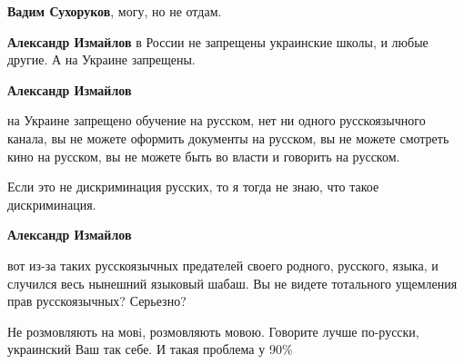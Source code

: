 \begin{itemize}
\begin{itemize}
 
\textbf{Вадим Сухоруков}, могу, но не отдам.

 
\textbf{Александр Измайлов} в России не запрещены украинские школы, и любые другие. А на Украине запрещены.

 
\textbf{Александр Измайлов} 

на Украине запрещено обучение на русском, нет ни одного русскоязычного канала,
вы не можете оформить документы на русском, вы не можете смотреть кино на
русском, вы не можете быть во власти и говорить на русском.

Если это не дискриминация русских, то я тогда не знаю, что такое дискриминация.

 
\textbf{Александр Измайлов} 

вот из-за таких русскоязычных предателей своего родного, русского, языка, и
случился весь нынешний языковый шабаш. Вы не видете тотального ущемления прав
русскоязычных? Серьезно?

 
Не розмовляють на мовi, розмовляють мовою. Говорите лучше по-русски, украинский Ваш так себе. И такая проблема у 90\%

 

\end{itemize}
\end{itemize}
